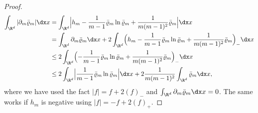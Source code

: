 \begin{proof}
\begin{equation}\label{dmrho}
\begin{split} \int_{\R^d} |\partial_m \bar\varrho_m| \dx x &= \int_{\R^d} \Bigl |h_m - \frac{1}{m-1}\bar\varrho_m \ln \bar\varrho_m + \frac{1}{m(m-1)^2}\bar\varrho_m \Bigr| \dx x\\
&= \int_{\R^d}\partial_m \bar\varrho_m \dx x + 2\int_{\R^d} \Bigl(h_m - \frac{1}{m-1}\bar\varrho_m \ln \bar\varrho_m + \frac{1}{m(m-1)^2}\bar\varrho_m \Bigr)_- \dx x \\
&\leq 2 \int_{\R^d} \Bigl(- \frac{1}{m-1}\bar\varrho_m \ln \bar\varrho_m + \frac{1}{m(m-1)^2}\bar\varrho_m \Bigr)_- \dx x \\
&\leq 2 \int_{\R^d} \Bigl|\frac{1}{m-1}\bar\varrho_m \ln \bar\varrho_m \Bigr| \dx x + 2 \frac{1}{m(m-1)^2}\int_{\R^d}\bar\varrho_m \dx x,
\end{split}
\end{equation}
where we have used the fact $|f| = f + 2 (f)_-$ and $\int_{\R^d}\partial_m \bar\varrho_m \dx x=0$. The same works if $h_m$ is negative using $|f|=-f +2 (f)_+$.


\end{proof}
